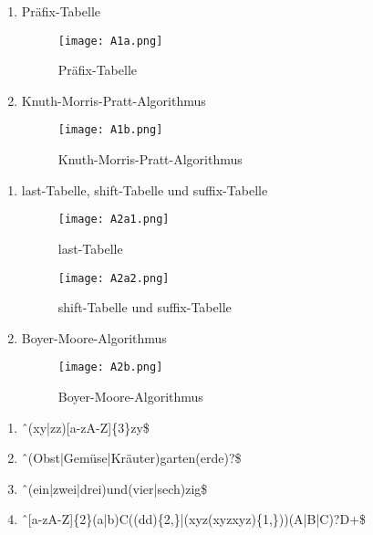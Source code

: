 \documentclass[12pt]{scrartcl}
\begin{document}
\begin{enumerate}
  \item Präfix-Tabelle
    \begin{figure}[!h]
      \centering
        \texttt{[image: A1a.png]}
      \caption{Präfix-Tabelle}
    \end{figure}

    \item Knuth-Morris-Pratt-Algorithmus
    \begin{figure}[!h]
      \centering
        \texttt{[image: A1b.png]}
      \caption{Knuth-Morris-Pratt-Algorithmus}
    \end{figure}

\end{enumerate}

\begin{enumerate}
  \item last-Tabelle, shift-Tabelle und suffix-Tabelle
    \begin{figure}[!h]
      \centering
        \texttt{[image: A2a1.png]}
      \caption{last-Tabelle}
    \end{figure}

    \begin{figure}[!h]
      \centering
        \texttt{[image: A2a2.png]}
      \caption{shift-Tabelle und suffix-Tabelle}
    \end{figure}

    \newpage

    \item Boyer-Moore-Algorithmus
    \begin{figure}[!h]
      \centering
        \texttt{[image: A2b.png]}
      \caption{Boyer-Moore-Algorithmus}
    \end{figure}

\end{enumerate}

\begin{enumerate}
  \item \^\ (xy|zz)[a-zA-Z]\{3\}zy\$
  \item \^\ (Obst|Gemüse|Kräuter)garten(erde)?\$
  \item \^\ (ein|zwei|drei)und(vier|sech)zig\$
  \item \^\ [a-zA-Z]\{2\}(a|b)C((dd)\{2,\}|(xyz(xyzxyz)\{1,\}))(A|B|C)?D+\$
\end{enumerate}
\end{document}
